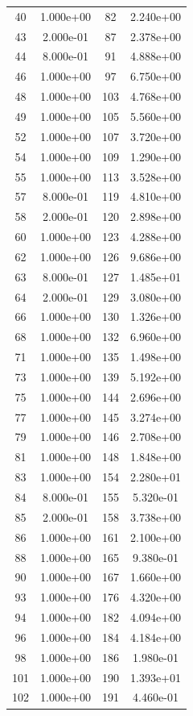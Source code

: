 \documentclass[12pt]{article}
\begin{document}
\begin{longtable}{@{}cccc@{}}
40 & 1.000e+00 & 82 & 2.240e+00 \\
43 & 2.000e-01 & 87 & 2.378e+00 \\
44 & 8.000e-01 & 91 & 4.888e+00 \\
46 & 1.000e+00 & 97 & 6.750e+00 \\
48 & 1.000e+00 & 103 & 4.768e+00 \\
49 & 1.000e+00 & 105 & 5.560e+00 \\
52 & 1.000e+00 & 107 & 3.720e+00 \\
54 & 1.000e+00 & 109 & 1.290e+00 \\
55 & 1.000e+00 & 113 & 3.528e+00 \\
57 & 8.000e-01 & 119 & 4.810e+00 \\
58 & 2.000e-01 & 120 & 2.898e+00 \\
60 & 1.000e+00 & 123 & 4.288e+00 \\
62 & 1.000e+00 & 126 & 9.686e+00 \\
63 & 8.000e-01 & 127 & 1.485e+01 \\
64 & 2.000e-01 & 129 & 3.080e+00 \\
66 & 1.000e+00 & 130 & 1.326e+00 \\
68 & 1.000e+00 & 132 & 6.960e+00 \\
71 & 1.000e+00 & 135 & 1.498e+00 \\
73 & 1.000e+00 & 139 & 5.192e+00 \\
75 & 1.000e+00 & 144 & 2.696e+00 \\
77 & 1.000e+00 & 145 & 3.274e+00 \\
79 & 1.000e+00 & 146 & 2.708e+00 \\
81 & 1.000e+00 & 148 & 1.848e+00 \\
83 & 1.000e+00 & 154 & 2.280e+01 \\
84 & 8.000e-01 & 155 & 5.320e-01 \\
85 & 2.000e-01 & 158 & 3.738e+00 \\
86 & 1.000e+00 & 161 & 2.100e+00 \\
88 & 1.000e+00 & 165 & 9.380e-01 \\
90 & 1.000e+00 & 167 & 1.660e+00 \\
93 & 1.000e+00 & 176 & 4.320e+00 \\
94 & 1.000e+00 & 182 & 4.094e+00 \\
96 & 1.000e+00 & 184 & 4.184e+00 \\
98 & 1.000e+00 & 186 & 1.980e-01 \\
101 & 1.000e+00 & 190 & 1.393e+01 \\
102 & 1.000e+00 & 191 & 4.460e-01 \\

\end{longtable}
\end{document}
